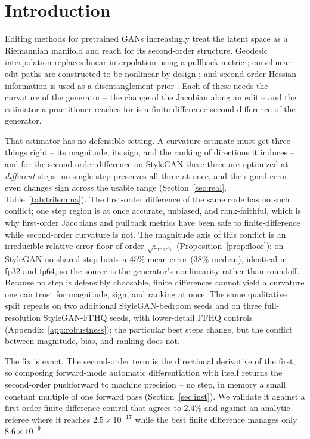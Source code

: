 \documentclass[10pt]{article}
\newcommand{\eps}{\varepsilon}
\begin{document}
\section{Introduction}
\label{sec:intro}
Editing methods for pretrained GANs increasingly treat the latent space as a Riemannian
manifold and reach for its second-order structure. Geodesic interpolation replaces linear
interpolation using a pullback metric \citep{arvanitidis2018,shao2018,chen2018}; curvilinear
edit paths are constructed to be nonlinear by design \citep{aoshima2023}; and second-order
Hessian information is used as a disentanglement prior \citep{peebles2020}. Each of these
needs the curvature of the generator -- the change of the Jacobian along an edit -- and the
estimator a practitioner reaches for is a finite-difference second difference of the
generator.

That estimator has no defensible setting. A curvature estimate must get three things right -- its
magnitude, its sign, and the ranking of directions it induces -- and for the second-order difference on
StyleGAN these three are optimized at \emph{different} steps: no single step preserves all three at once, and
the signed error even changes sign across the usable range (Section~\ref{sec:real},
Table~\ref{tab:trilemma}). The first-order difference of the same code has no such conflict; one step
region is at once accurate, unbiased, and rank-faithful, which is why first-order Jacobians and pullback
metrics have been safe to finite-difference while second-order curvature is not. The magnitude axis of
this conflict is an irreducible relative-error floor of order $\sqrt{\eps_{\mathrm{mach}}}$
(Proposition~\ref{prop:floor}): on StyleGAN no shared step beats a $45\%$ mean error ($38\%$ median),
identical in fp32 and fp64, so the source is the generator's nonlinearity rather than roundoff. Because
no step is defensibly choosable, finite differences cannot yield a curvature one can trust for
magnitude, sign, and ranking at once.
The same qualitative split repeats on two additional StyleGAN-bedroom seeds and on three full-resolution
StyleGAN-FFHQ seeds, with lower-detail FFHQ controls (Appendix~\ref{app:robustness}); the particular best steps change, but the
conflict between magnitude, bias, and ranking does not.

The fix is exact. The second-order term is the directional
derivative of the first, so composing forward-mode automatic differentiation with itself
returns the second-order pushforward to machine precision -- no step, in memory
a small constant multiple of one forward pass (Section~\ref{sec:inst}). We validate it
against a first-order finite-difference control that agrees to $2.4\%$ and against an
analytic referee where it reaches $2.5\times10^{-17}$ while the best finite difference
manages only $8.6\times10^{-9}$.
\end{document}
